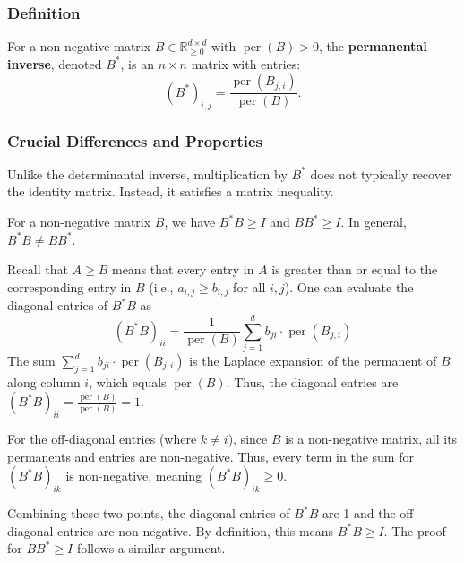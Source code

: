 \documentclass[11pt]{article}
\makeatletter
\theoremstyle{definition}
\newenvironment{proof}[1][\protect\proofname]{\par
	\normalfont\topsep6\p@\@plus6\p@\relax
	\trivlist
	\itemindent\parindent        %
	\item[\hskip\labelsep\scshape #1]\ignorespaces
}{%
	\endtrivlist\@endpefalse
}
\providecommand{\proofname}{Proof}
\DeclareMathOperator{\per}{per}
\makeatother
\begin{document}
\subsubsection{Definition}
\begin{definition}
	For a non-negative matrix $B \in \mathbb{R}^{d \times d}_{\ge 0}$ with $\per(B) > 0$, the \textbf{permanental inverse}, denoted $B^*$, is an $n\times n$ matrix with entries:
	\begin{equation*}
		(B^*)_{i,j} = \frac{\per(B_{j,i})}{\per(B)}.
	\end{equation*}
\end{definition}

\subsubsection{Crucial Differences and Properties}
Unlike the determinantal inverse, multiplication by $B^*$ does not typically recover the identity matrix. Instead, it satisfies a matrix inequality.

\begin{claim}
	\label{claim:perm-inverse-basic}
	For a non-negative matrix $B$, we have $B^*B \ge I$ and $BB^* \ge I$. In general, $B^*B \neq BB^*$.  
\end{claim}
\begin{proof}
Recall that $A \ge B$ means that every entry in $A$ is greater than or equal to the corresponding entry in $B$ (i.e., $a_{i,j} \ge b_{i,j}$ for all $i,j$).
One can evaluate the diagonal entries of $B^*B$ as
	\begin{equation*}
		(B^*B)_{ii} = \frac{1}{\per(B)} \sum_{j=1}^{d} b_{ji} \cdot \per(B_{j,i})
	\end{equation*}
	The sum $\sum_{j=1}^{d} b_{ji} \cdot \per(B_{j,i})$ is the Laplace expansion of the permanent of $B$ along column $i$, which equals $\per(B)$. Thus, the diagonal entries are $(B^*B)_{ii} = \frac{\per(B)}{\per(B)} = 1$.
	
	For the off-diagonal entries (where $k \neq i$), since $B$ is a non-negative matrix, all its permanents and entries are non-negative. Thus, every term in the sum for $(B^*B)_{ik}$ is non-negative, meaning $(B^*B)_{ik} \ge 0$.
	
	Combining these two points, the diagonal entries of $B^*B$ are 1 and the off-diagonal entries are non-negative. By definition, this means $B^*B \ge I$. The proof for $BB^* \ge I$ follows a similar argument.
\end{proof}
\end{document}
